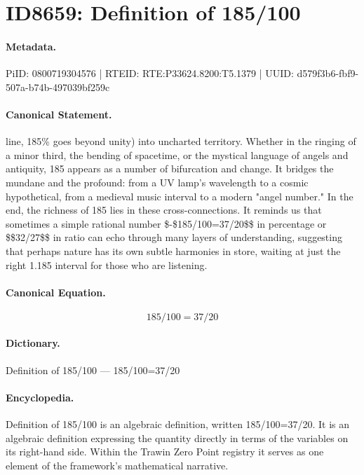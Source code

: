 \section*{ID8659: Definition of 185/100}
\paragraph{Metadata.}
PiID: 0800719304576 | RTEID: RTE:P33624.8200:T5.1379 | UUID: d579f3b6-fbf9-507a-b74b-497039bf259c

\paragraph{Canonical Statement.}
line, 185\% goes beyond unity) into uncharted territory. Whether in the ringing of a minor third, the bending of spacetime, or the mystical language of angels and antiquity, 185 appears as a number of bifurcation and change. It bridges the mundane and the profound: from a UV lamp's wavelength to a cosmic hypothetical, from a medieval music interval to a modern "angel number." In the end, the richness of 185 lies in these cross-connections. It reminds us that sometimes a simple rational number \$-\$185/100=37/20\$\$ in percentage or \$\$32/27\$\$ in ratio can echo through many layers of understanding, suggesting that perhaps nature has its own subtle harmonies in store, waiting at just the right 1.185 interval for those who are listening.

\paragraph{Canonical Equation.}
\[
185/100=37/20
\]

\paragraph{Dictionary.}
Definition of 185/100 — 185/100=37/20

\paragraph{Encyclopedia.}
Definition of 185/100 is an algebraic definition, written 185/100=37/20. It is an algebraic definition expressing the quantity directly in terms of the variables on its right-hand side. Within the Trawin Zero Point registry it serves as one element of the framework's mathematical narrative.
